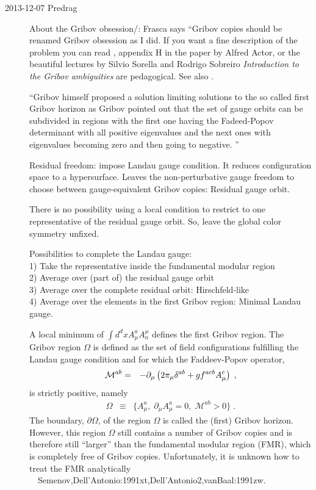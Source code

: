 \begin{description}
\item[2013-12-07  Predrag]
About the
{Gribov obsession/}: Frasca says ``Gribov copies should be renamed Gribov
obsession as I did. If you want a fine description of the problem you can
read , appendix H in the paper by Alfred Actor, or the
beautiful lectures by Silvio Sorella and Rodrigo Sobreiro
{\em Introduction to the {Gribov} ambiguities} are pedagogical.
See also
.

``Gribov himself proposed a solution limiting solutions to the so called
first Gribov horizon as Gribov pointed out that the set of gauge orbits
can be subdivided in regions with the first one having the Fadeed-Popov
determinant with all positive eigenvalues and the next ones with
eigenvalues becoming zero and then going to negative. ''

Residual freedom: impose Landau gauge condition. It reduces configuration
space to a hypersurface. Leaves the non-perturbative gauge freedom to
choose between gauge-equivalent Gribov copies: Residual gauge orbit.

There is no possibility using a local condition to restrict to one
representative of the residual gauge orbit. So, leave the global color
symmetry unfixed.

Possibilities to complete the Landau gauge:
\\
1) Take the representative inside the fundamental
modular region
\\
2) Average over (part of) the residual gauge orbit
\\
3) Average over the complete residual orbit: Hirschfeld-like
\\
4)
Average over the elements in the first Gribov region:
Minimal Landau gauge.

A local minimum of $\int d^dx A_\mu^a A^\mu_a$
defines the first Gribov region.
The Gribov region $\Omega$ is  defined as the set of
field configurations fulfilling the Landau gauge condition and for
which the Faddeev-Popov operator,
\begin{eqnarray}
\mathcal{M}^{ab} &=&  -\partial_{\mu}\left( 2\pi_{\mu} \delta^{ab}
    + g f^{acb} A^c_{\mu} \right) \;,
\end{eqnarray}
is strictly positive, namely
\begin{eqnarray}
\Omega &\equiv &\{ A^a_{\mu}, \; \partial_{\mu} A^a_{\mu}=0,
    \; \mathcal{M}^{ab}  >0\} \;.
\end{eqnarray}
The boundary, $\partial \Omega$, of the region $\Omega$ is called the
(first) Gribov horizon. However, this region $\Omega$ still
contains a number of Gribov copies and is therefore still ``larger'' than
the fundamental modular region (FMR), which is completely free of Gribov
copies. Unfortunately, it is unknown how to treat the FMR analytically
~~{Semenov,Dell'Antonio:1991xt,Dell'Antonio2,vanBaal:1991zw}.


\end{description}
